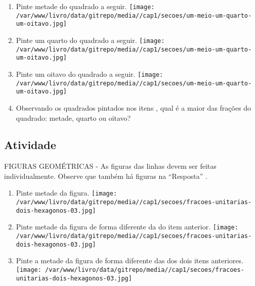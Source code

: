 \documentclass[a4,12pt]{book}
\begin{document}
\begin{enumerate} [\quad a)] %
  \item     Pinte metade do quadrado a seguir.    \mbox{} \newline              \texttt{[image: /var/www/livro/data/gitrepo/media//cap1/secoes/um-meio-um-quarto-um-oitavo.jpg]}
  \item     Pinte um quarto do quadrado a seguir.    \mbox{} \newline              \texttt{[image: /var/www/livro/data/gitrepo/media//cap1/secoes/um-meio-um-quarto-um-oitavo.jpg]}
  \item     Pinte um oitavo do quadrado a seguir.    \mbox{} \newline              \texttt{[image: /var/www/livro/data/gitrepo/media//cap1/secoes/um-meio-um-quarto-um-oitavo.jpg]}
  \item     Observando os quadrados pintados nos itens , qual é a maior das frações do quadrado: metade, quarto ou oitavo?
\end{enumerate} %







\subsection{Atividade}






\begin{imagem*}[breakable]{}{}   FIGURAS GEOMÉTRICAS - As figuras das linhas devem ser feitas individualmente. Observe que também há figuras na   ``Resposta''  .  
\end{imagem*}
\begin{enumerate} [\quad I)] %
  \item     Pinte metade da figura.     \mbox{} \newline              \texttt{[image: /var/www/livro/data/gitrepo/media//cap1/secoes/fracoes-unitarias-dois-hexagonos-03.jpg]}
  \item     Pinte metade da figura de forma diferente da do item anterior.     \mbox{} \newline              \texttt{[image: /var/www/livro/data/gitrepo/media//cap1/secoes/fracoes-unitarias-dois-hexagonos-03.jpg]}
  \item     Pinte a metade da figura de forma diferente das dos dois itens anteriores.     \mbox{} \newline              \texttt{[image: /var/www/livro/data/gitrepo/media//cap1/secoes/fracoes-unitarias-dois-hexagonos-03.jpg]}
\end{enumerate} %
\end{document}

